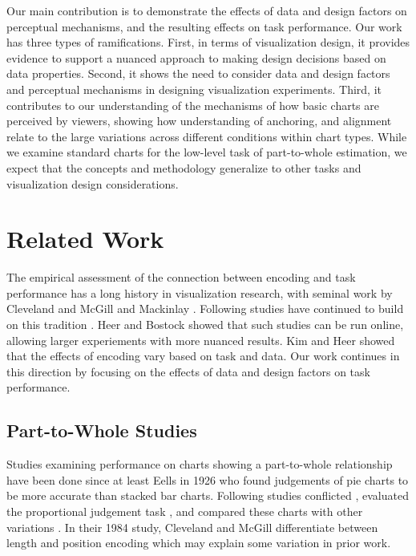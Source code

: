\documentclass[preprint]{vgtc}               %
\begin{document}
Our main contribution is to demonstrate the effects of data and design factors on perceptual mechanisms, and the resulting effects on task performance.
Our work has three types of ramifications. 
First, in terms of visualization design, it provides evidence to support a nuanced approach to making design decisions based on data properties.
Second, it shows the need to consider data and design factors and perceptual mechanisms in designing visualization experiments. 
Third, it contributes to our understanding of the mechanisms of how basic charts are perceived by viewers, showing how understanding of anchoring, and alignment relate to the large variations across different conditions within chart types. 
While we examine standard charts for the low-level task of part-to-whole estimation, we expect that the concepts and methodology generalize to other tasks and visualization design considerations.

\section{Related Work}
The empirical assessment of the connection between encoding and task performance has a long history in visualization research, with seminal work by Cleveland and McGill \cite{cleveland1985GraphicalPerceptionGraphical} and Mackinlay \cite{mackinlay1986AutomatingDesignGraphical}.
Following studies have continued to build on this tradition \cite{quadri2022SurveyPerceptionBasedVisualization,zeng2023ReviewCollationGraphical}. 
Heer and Bostock \cite{heer2010CrowdsourcingGraphicalPerception} 
showed that such studies can be run online, allowing larger experiements with more nuanced results.
Kim and Heer \cite{kim2018AssessingEffectsTask} showed that the 
effects of encoding vary based on task and data.
Our work continues in this direction by focusing on the effects of data and design factors on task performance.

\subsection{Part-to-Whole Studies}
\label{sec:partWhole}

Studies examining performance on charts showing a part-to-whole relationship have been done since at least Eells \cite{eells1926RelativeMeritsCircles} in 1926 who found judgements of pie charts to be more accurate than stacked bar charts. 
Following studies conflicted \cite{vonhuhn1927FurtherStudiesGraphic}, evaluated the proportional judgement task \cite{croxton1927BarChartsCircle, cleveland1985GraphicalPerceptionGraphical, mccoleman2021RethinkingRanksVisual}, and compared these charts with other variations \cite{peterson1954HowAccuratelyAre}. 
In their 1984 study, Cleveland and McGill \cite{cleveland1984GraphicalPerceptionTheory} differentiate between length and position encoding which may explain some variation in prior work. 
\end{document}
